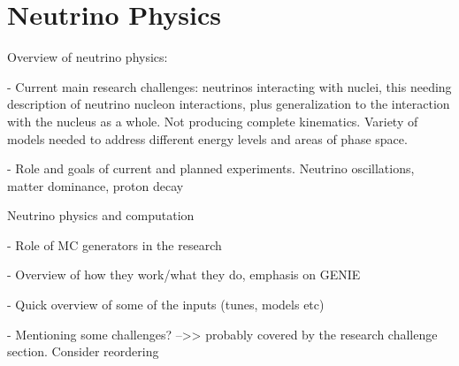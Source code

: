
\chapter{Neutrino Physics}

Overview of neutrino physics:

- Current main research challenges: neutrinos interacting with nuclei, this needing description of neutrino nucleon interactions, plus generalization to the interaction with the nucleus as a whole. Not producing complete kinematics. Variety of models needed to address different energy levels and areas of phase space.

- Role and goals of current and planned experiments. Neutrino oscillations, matter dominance, proton decay

Neutrino physics and computation

- Role of MC generators in the research

- Overview of how they work/what they do, emphasis on GENIE

- Quick overview of some of the inputs (tunes, models etc)

- Mentioning some challenges? -->> probably covered by the research challenge section. Consider reordering

